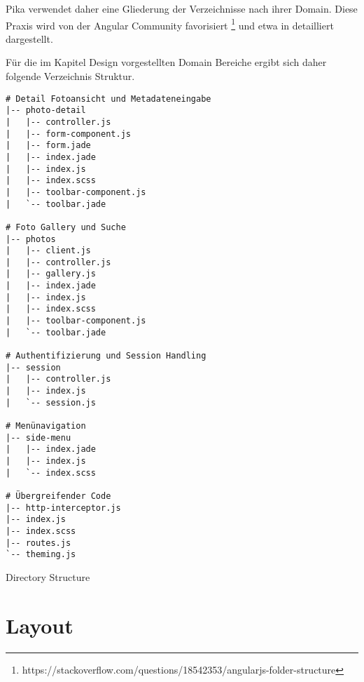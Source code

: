 Pika verwendet daher eine Gliederung der Verzeichnisse nach ihrer Domain. Diese Praxis wird von der Angular Community favorisiert \footnote{https://stackoverflow.com/questions/18542353/angularjs-folder-structure} und etwa in \cite{Kukic:2014} detailliert dargestellt.

Für die im Kapitel Design vorgestellten Domain Bereiche ergibt sich daher folgende Verzeichnis Struktur.

\begin{listing}[H]
\begin{verbatim}
# Detail Fotoansicht und Metadateneingabe 
|-- photo-detail 
|   |-- controller.js
|   |-- form-component.js
|   |-- form.jade
|   |-- index.jade
|   |-- index.js
|   |-- index.scss
|   |-- toolbar-component.js
|   `-- toolbar.jade

# Foto Gallery und Suche
|-- photos
|   |-- client.js
|   |-- controller.js
|   |-- gallery.js
|   |-- index.jade
|   |-- index.js
|   |-- index.scss
|   |-- toolbar-component.js
|   `-- toolbar.jade

# Authentifizierung und Session Handling
|-- session
|   |-- controller.js
|   |-- index.js
|   `-- session.js

# Menünavigation
|-- side-menu
|   |-- index.jade
|   |-- index.js
|   `-- index.scss

# Übergreifender Code
|-- http-interceptor.js
|-- index.js
|-- index.scss
|-- routes.js
`-- theming.js
\end{verbatim}
\caption{Directory Structure}
\label{lst:directorty_structure}
\end{listing}
\section{Layout}





